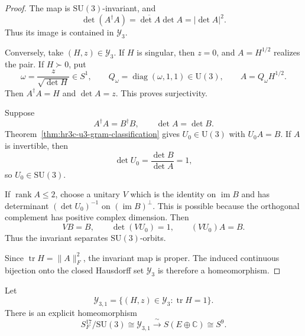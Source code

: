 \begin{proof}
The map is \(\mathrm{SU}(3)\)-invariant, and
\[
 \det(A^\dagger A)
 =\overline{\det A}\det A
 =|\det A|^2.
\]
Thus its image is contained in \(\mathcal Y_3\).

Conversely, take \((H,z)\in\mathcal Y_3\).  If \(H\) is singular, then
\(z=0\), and \(A=H^{1/2}\) realizes the pair.  If \(H\succ0\), put
\[
 \omega=\frac{z}{\sqrt{\det H}}\in S^1,
 \qquad
 Q_\omega=\operatorname{diag}(\omega,1,1)\in\mathrm U(3),
 \qquad
 A=Q_\omega H^{1/2}.
\]
Then \(A^\dagger A=H\) and \(\det A=z\).  This proves surjectivity.

Suppose
\[
 A^\dagger A=B^\dagger B,
 \qquad
 \det A=\det B.
\]
Theorem~\ref{thm:hr3c-u3-gram-classification} gives
\(U_0\in\mathrm U(3)\) with \(U_0A=B\).  If \(A\) is invertible, then
\[
 \det U_0=\frac{\det B}{\det A}=1,
\]
so \(U_0\in\mathrm{SU}(3)\).

If \(\operatorname{rank}A\leq2\), choose a unitary \(V\) which is the
identity on \(\operatorname{im}B\) and has determinant
\((\det U_0)^{-1}\) on \((\operatorname{im}B)^\perp\).  This is possible
because the orthogonal complement has positive complex dimension.  Then
\[
 VB=B,
 \qquad
 \det(VU_0)=1,
 \qquad
 (VU_0)A=B.
\]
Thus the invariant separates \(\mathrm{SU}(3)\)-orbits.

Since \(\operatorname{tr}H=\lVert A\rVert_F^2\), the invariant map is
proper.  The induced continuous bijection onto the closed Hausdorff set
\(\mathcal Y_3\) is therefore a homeomorphism.
\end{proof}

\begin{theorem}
\label{thm:hr3c-su-unit-sphere}
Let
\begin{equation}
 \mathcal Y_{3,1}=
 \{(H,z)\in\mathcal Y_3:\operatorname{tr}H=1\}.
 \label{eq:hr3c-su-unit-image}
\end{equation}
There is an explicit homeomorphism
\begin{equation}
 S^{17}_F/\mathrm{SU}(3)
 \cong
 \mathcal Y_{3,1}
 \xrightarrow{\ \sim\ }
 S(E\oplus\mathbb C)
 \cong S^9.
 \label{eq:hr3c-su-unit-sphere-result}
\end{equation}
\end{theorem}

